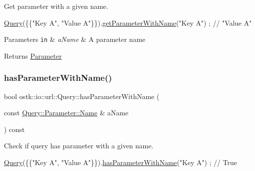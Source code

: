Get parameter with a given name. 


\begin{DoxyCode}
\hyperlink{classostk_1_1io_1_1url_1_1_query_a10299b6b445c39886d6b689c14364fe1}{Query}(\{\{\textcolor{stringliteral}{"Key A"}, \textcolor{stringliteral}{"Value A"}\}\}).\hyperlink{classostk_1_1io_1_1url_1_1_query_ac55b9803b0807160ea5aa42912b412b4}{getParameterWithName}(\textcolor{stringliteral}{"Key A"}) ; \textcolor{comment}{// "Value A"}
\end{DoxyCode}



\begin{DoxyParams}[1]{Parameters}
\mbox{\tt in}  & {\em a\+Name} & A parameter name \\
\hline
\end{DoxyParams}
\begin{DoxyReturn}{Returns}
\hyperlink{classostk_1_1io_1_1url_1_1_query_1_1_parameter}{Parameter} 
\end{DoxyReturn}
\mbox{\label{classostk_1_1io_1_1url_1_1_query_a58d1738acbe0d1c2fa329245f7a75eb5}} 
\subsubsection{\texorpdfstring{has\+Parameter\+With\+Name()}{hasParameterWithName()}}
{\footnotesize\ttfamily bool ostk\+::io\+::url\+::\+Query\+::has\+Parameter\+With\+Name (\begin{DoxyParamCaption}\item[{const \hyperlink{classostk_1_1io_1_1url_1_1_query_1_1_parameter_ad176899a3555e0d0efeb0c13f73a8a80}{Query\+::\+Parameter\+::\+Name} \&}]{a\+Name }\end{DoxyParamCaption}) const}



Check if query has parameter with a given name. 


\begin{DoxyCode}
\hyperlink{classostk_1_1io_1_1url_1_1_query_a10299b6b445c39886d6b689c14364fe1}{Query}(\{\{\textcolor{stringliteral}{"Key A"}, \textcolor{stringliteral}{"Value A"}\}\}).\hyperlink{classostk_1_1io_1_1url_1_1_query_a58d1738acbe0d1c2fa329245f7a75eb5}{hasParameterWithName}(\textcolor{stringliteral}{"Key A"}) ; \textcolor{comment}{// True}
\end{DoxyCode}



